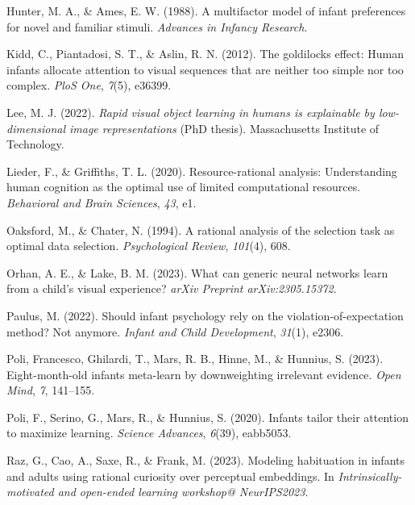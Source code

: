 \documentclass[10pt, letterpaper]{article}
\newenvironment{CSLReferences}%
  {}%
  {\par}
\begin{document}
\begin{CSLReferences}{1}{0}
\leavevmode{}%
Hunter, M. A., \& Ames, E. W. (1988). A multifactor model of infant
preferences for novel and familiar stimuli. \emph{Advances in Infancy
Research}.

\leavevmode{}%
Kidd, C., Piantadosi, S. T., \& Aslin, R. N. (2012). The goldilocks
effect: Human infants allocate attention to visual sequences that are
neither too simple nor too complex. \emph{PloS One}, \emph{7}(5),
e36399.

\leavevmode{}%
Lee, M. J. (2022). \emph{Rapid visual object learning in humans is
explainable by low-dimensional image representations} (PhD thesis).
Massachusetts Institute of Technology.

\leavevmode{}%
Lieder, F., \& Griffiths, T. L. (2020). Resource-rational analysis:
Understanding human cognition as the optimal use of limited
computational resources. \emph{Behavioral and Brain Sciences},
\emph{43}, e1.

\leavevmode{}%
Oaksford, M., \& Chater, N. (1994). A rational analysis of the selection
task as optimal data selection. \emph{Psychological Review},
\emph{101}(4), 608.

\leavevmode{}%
Orhan, A. E., \& Lake, B. M. (2023). What can generic neural networks
learn from a child's visual experience? \emph{arXiv Preprint
arXiv:2305.15372}.

\leavevmode{}%
Paulus, M. (2022). Should infant psychology rely on the
violation-of-expectation method? Not anymore. \emph{Infant and Child
Development}, \emph{31}(1), e2306.

\leavevmode{}%
Poli, Francesco, Ghilardi, T., Mars, R. B., Hinne, M., \& Hunnius, S.
(2023). Eight-month-old infants meta-learn by downweighting irrelevant
evidence. \emph{Open Mind}, \emph{7}, 141--155.

\leavevmode{}%
Poli, F., Serino, G., Mars, R., \& Hunnius, S. (2020). Infants tailor
their attention to maximize learning. \emph{Science Advances},
\emph{6}(39), eabb5053.

\leavevmode{}%
Raz, G., Cao, A., Saxe, R., \& Frank, M. (2023). Modeling habituation in
infants and adults using rational curiosity over perceptual embeddings.
In \emph{Intrinsically-motivated and open-ended learning workshop@
NeurIPS2023}.


\end{CSLReferences}
\end{document}

